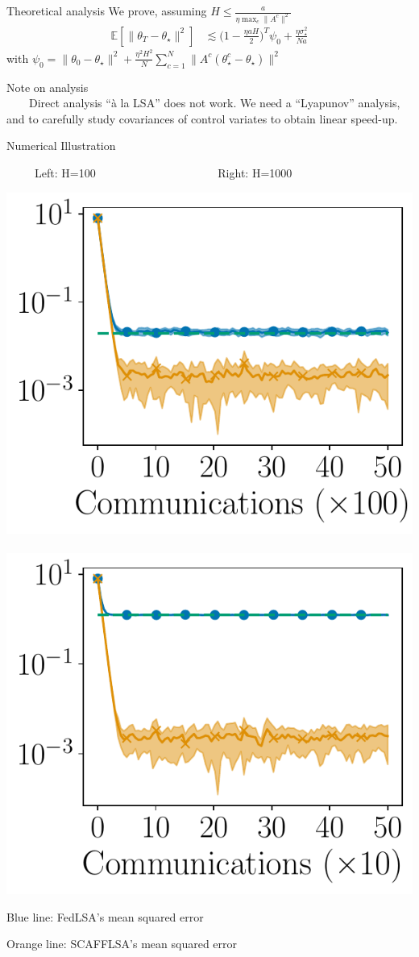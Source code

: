 \documentclass[aspectratio=169,14pt]{beamer}
\begin{document}
\begin{frame}{Theoretical analysis}
  We prove, assuming $H \le \frac{a}{\eta \max_c \| A^c \|^2}$
  \begin{align*}
    \mathbb{E}[\| \theta_{T} - \theta_\star \|^2]
    & \lesssim{}
      \big( 
      1 - \tfrac{\eta a H}{2}
      \big)^T \psi_0
      +
      \frac{\eta \sigma_\star^2}{N a}
  \end{align*}
  with $\psi_0 = \| \theta_0 - \theta_\star \|^2 + \frac{\eta^2H^2}{N} \sum_{c=1}^N \| A^c( \theta_\star^c - \theta_\star) \|^2$


  \vspace{1em}

  \pause
  
  \small

  Note on analysis\\  
  ~~~~Direct analysis ``à la LSA'' does not work. We need a ``Lyapunov'' analysis, and to carefully study covariances of control variates to obtain linear speed-up.
\end{frame}

\begin{frame}{Numerical Illustration}
  \vspace{-0.5em}
  
  \begin{center}
    ~~~~~Left: H=100~~~~~~~~~~~~~~~~~~~~~
    Right: H=1000
 
    \vspace{-1em}
   
    \includegraphics[width=0.4\linewidth]{images/plot_hg_100_n100.pdf}
    ~~
    \includegraphics[width=0.4\linewidth]{images/plot_hg_1000_n100.pdf}
  \end{center}

  \vspace{-1em}

  Blue line: FedLSA's mean squared error

  \vspace{-1em}

  Orange line: SCAFFLSA's mean squared error
\end{frame}
\end{document}
